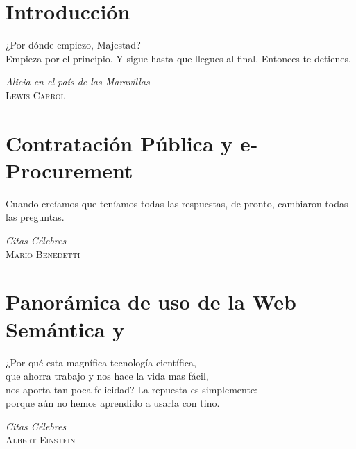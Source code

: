 \documentclass[a4paper,final,11pt,fleqn]{book}  %
\begin{document}
\title{\NombrePFC}
\author{\AutorPFC}
\date{\FechaEntregaPFC}

\frontmatter


%









\tableofcontents

\listoffigures

\listoftables

\mainmatter

\chapter{\label{capitulo:introduccion}Introducción} %
\epigraph{¿Por dónde empiezo, Majestad? \\ Empieza por el principio. Y sigue hasta que llegues al final. Entonces te detienes.}
{\textit{Alicia en el país de las Maravillas}\\ \textsc{Lewis Carrol}}

\chapter{\label{capitulo:eprocurement}Contratación Pública y e-Procurement}%
\epigraph{Cuando creíamos que teníamos todas las respuestas, de pronto, cambiaron todas las preguntas.}
{\textit{Citas Célebres}\\ \textsc{Mario Benedetti}}
%
\chapter{\label{capitulo:semantica}Panorámica de uso de la Web Semántica y \linkeddata} 
\epigraph{¿Por qué esta magnífica tecnología científica, \\ que ahorra trabajo y nos hace la vida mas fácil, \\ nos aporta tan poca felicidad? La repuesta es simplemente: \\ porque aún no hemos aprendido a usarla con tino.}
{\textit{Citas Célebres}\\ \textsc{Albert Einstein}}
%
\end{document}
